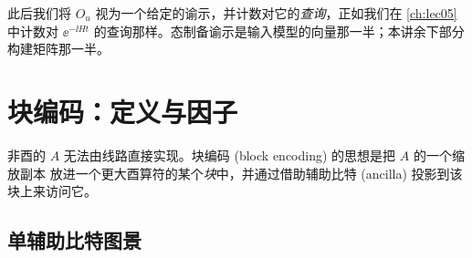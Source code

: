 此后我们将 $O_u$ 视为一个给定的谕示，并计数对它的\emph{查询}，正如我们在 \cref{ch:lec05} 中计数对
$\ee^{-\ii Ht}$ 的查询那样。态制备谕示是输入模型的向量那一半；本讲余下部分构建矩阵那一半。
\section{块编码：定义与因子}
\label{sec:lec06-2}

非酉的 $A$ 无法由线路直接实现。块编码 (block encoding) 的思想是把 $A$ 的一个缩放副本
放进一个更大酉算符的某个\emph{块}中，并通过借助辅助比特 (ancilla) 投影到该块上来访问它。

\subsection*{单辅助比特图景}

